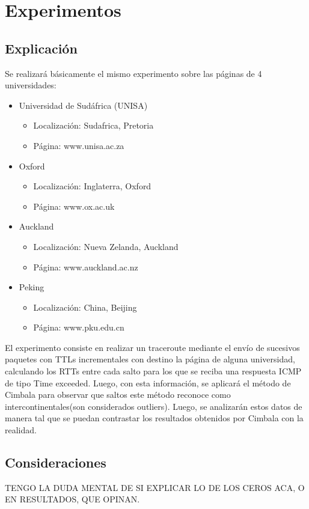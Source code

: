 \section{Experimentos}

\subsection{Explicación}
Se realizará básicamente el mismo experimento sobre las páginas de 4 universidades:

\begin{itemize}
	\item Universidad de Sudáfrica (UNISA)
	
	\begin{itemize}
		\item Localización: Sudafrica, Pretoria
		\item Página: www.unisa.ac.za
	\end{itemize}
		 
	\item Oxford
	
	\begin{itemize}
		\item Localización: Inglaterra, Oxford 
		\item Página: www.ox.ac.uk
	\end{itemize}

	\item Auckland
	 
	\begin{itemize}
		\item Localización: Nueva Zelanda, Auckland 
		\item Página: www.auckland.ac.nz
	\end{itemize}

	\item Peking
	 
	\begin{itemize}
		\item Localización: China, Beijing 
		\item Página: www.pku.edu.cn
	\end{itemize}

\end{itemize}

 El experimento consiste en realizar un traceroute mediante el envío de sucesivos paquetes con TTLs incrementales con destino la página de alguna universidad, calculando los RTTs entre cada salto para los que se reciba una respuesta ICMP de tipo Time exceeded. Luego, con esta información, se aplicará el método de Cimbala para observar que saltos este método reconoce como intercontinentales(son considerados outliers). Luego, se analizarán estos datos de manera tal que se puedan contrastar los resultados obtenidos por Cimbala con la realidad.

\subsection{Consideraciones}

TENGO LA DUDA MENTAL DE SI EXPLICAR LO DE LOS CEROS ACA, O EN RESULTADOS, QUE OPINAN.